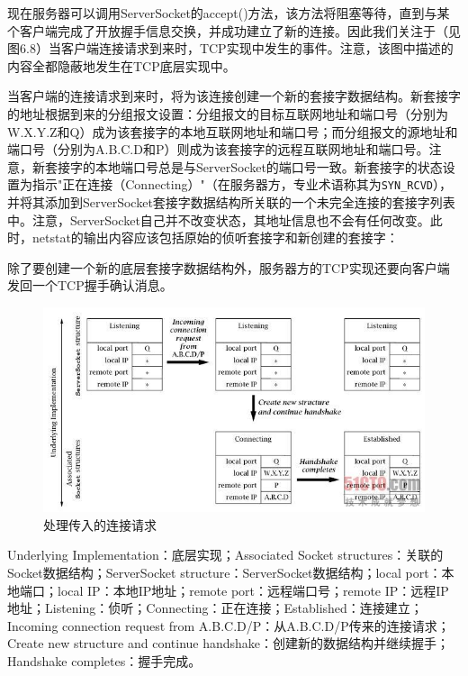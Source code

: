 		现在服务器可以调用ServerSocket的accept()方法，该方法将阻塞等待，直到与某个客户端完成了开放握手信息交换，并成功建立了新的连接。因此我们关注于（见图6.8）当客户端连接请求到来时，TCP实现中发生的事件。注意，该图中描述的内容全都隐蔽地发生在TCP底层实现中。

		当客户端的连接请求到来时，将为该连接创建一个新的套接字数据结构。新套接字的地址根据到来的分组报文设置：分组报文的目标互联网地址和端口号（分别为W.X.Y.Z和Q）成为该套接字的本地互联网地址和端口号；而分组报文的源地址和端口号（分别为A.B.C.D和P）则成为该套接字的远程互联网地址和端口号。注意，新套接字的本地端口号总是与ServerSocket的端口号一致。新套接字的状态设置为指示"正在连接（Connecting）"（在服务器方，专业术语称其为\verb|SYN_RCVD|），并将其添加到ServerSocket套接字数据结构所关联的一个未完全连接的套接字列表中。注意，ServerSocket自己并不改变状态，其地址信息也不会有任何改变。此时，netstat的输出内容应该包括原始的侦听套接字和新创建的套接字：

		

		除了要创建一个新的底层套接字数据结构外，服务器方的TCP实现还要向客户端发回一个TCP握手确认消息。

		\clearpage

		\begin{figure}[htbp]%
			\centering
			\includegraphics[scale=.6]{img/06.08.jpg}
			\caption{处理传入的连接请求}
			\label{fig:deal.income.connect.req}
		\end{figure}

		Underlying Implementation：底层实现；Associated Socket structures：关联的Socket数据结构；ServerSocket structure：ServerSocket数据结构；local port：本地端口；local IP：本地IP地址；remote port：远程端口号；remote IP：远程IP地址；Listening：侦听；Connecting：正在连接；Established：连接建立；Incoming connection request from A.B.C.D/P：从A.B.C.D/P传来的连接请求；Create new structure and continue handshake：创建新的数据结构并继续握手；Handshake completes：握手完成。

